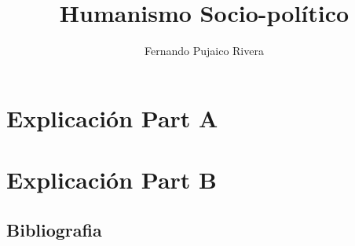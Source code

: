 \documentclass[a4paper,12pt]{book}
\title{Humanismo Socio-político}
\author{Fernando Pujaico Rivera}
\begin{document}
\maketitle

\renewcommand*\contentsname{Conteúdo}
\tableofcontents

\part{Explicación Part A}


\part{Explicación Part B}





\chapter*{Bibliografia}
\printbibliography[heading=bibempty]
\end{document}
